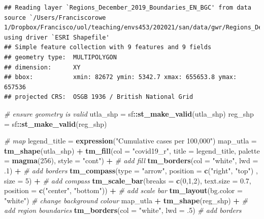 \documentclass[
]{book}
\newenvironment{Shaded}{\begin{snugshade}}{\end{snugshade}}
\newcommand{\CommentTok}[1]{\textcolor[rgb]{0.56,0.35,0.01}{\textit{#1}}}
\newcommand{\DataTypeTok}[1]{\textcolor[rgb]{0.13,0.29,0.53}{#1}}
\newcommand{\DecValTok}[1]{\textcolor[rgb]{0.00,0.00,0.81}{#1}}
\newcommand{\FloatTok}[1]{\textcolor[rgb]{0.00,0.00,0.81}{#1}}
\newcommand{\KeywordTok}[1]{\textcolor[rgb]{0.13,0.29,0.53}{\textbf{#1}}}
\newcommand{\NormalTok}[1]{#1}
\newcommand{\OperatorTok}[1]{\textcolor[rgb]{0.81,0.36,0.00}{\textbf{#1}}}
\newcommand{\StringTok}[1]{\textcolor[rgb]{0.31,0.60,0.02}{#1}}
\begin{document}
\begin{verbatim}
## Reading layer `Regions_December_2019_Boundaries_EN_BGC' from data source `/Users/Franciscorowe 1/Dropbox/Francisco/uol/teaching/envs453/202021/san/data/gwr/Regions_December_2019_Boundaries_EN_BGC.shp' using driver `ESRI Shapefile'
## Simple feature collection with 9 features and 9 fields
## geometry type:  MULTIPOLYGON
## dimension:      XY
## bbox:           xmin: 82672 ymin: 5342.7 xmax: 655653.8 ymax: 657536
## projected CRS:  OSGB 1936 / British National Grid
\end{verbatim}

\begin{Shaded}
\begin{Highlighting}[]
\CommentTok{# ensure geometry is valid}
\NormalTok{utla_shp =}\StringTok{ }\NormalTok{sf}\OperatorTok{::}\KeywordTok{st_make_valid}\NormalTok{(utla_shp)}
\NormalTok{reg_shp =}\StringTok{ }\NormalTok{sf}\OperatorTok{::}\KeywordTok{st_make_valid}\NormalTok{(reg_shp)}

\CommentTok{# map}
\NormalTok{legend_title =}\StringTok{ }\KeywordTok{expression}\NormalTok{(}\StringTok{"Cumulative cases per 100,000"}\NormalTok{)}
\NormalTok{map_utla =}\StringTok{ }\KeywordTok{tm_shape}\NormalTok{(utla_shp) }\OperatorTok{+}
\StringTok{  }\KeywordTok{tm_fill}\NormalTok{(}\DataTypeTok{col =} \StringTok{"covid19_r"}\NormalTok{, }\DataTypeTok{title =}\NormalTok{ legend_title, }\DataTypeTok{palette =} \KeywordTok{magma}\NormalTok{(}\DecValTok{256}\NormalTok{), }\DataTypeTok{style =} \StringTok{"cont"}\NormalTok{) }\OperatorTok{+}\StringTok{ }\CommentTok{# add fill}
\StringTok{  }\KeywordTok{tm_borders}\NormalTok{(}\DataTypeTok{col =} \StringTok{"white"}\NormalTok{, }\DataTypeTok{lwd =} \FloatTok{.1}\NormalTok{)  }\OperatorTok{+}\StringTok{ }\CommentTok{# add borders}
\StringTok{  }\KeywordTok{tm_compass}\NormalTok{(}\DataTypeTok{type =} \StringTok{"arrow"}\NormalTok{, }\DataTypeTok{position =} \KeywordTok{c}\NormalTok{(}\StringTok{"right"}\NormalTok{, }\StringTok{"top"}\NormalTok{) , }\DataTypeTok{size =} \DecValTok{5}\NormalTok{) }\OperatorTok{+}\StringTok{ }\CommentTok{# add compass}
\StringTok{  }\KeywordTok{tm_scale_bar}\NormalTok{(}\DataTypeTok{breaks =} \KeywordTok{c}\NormalTok{(}\DecValTok{0}\NormalTok{,}\DecValTok{1}\NormalTok{,}\DecValTok{2}\NormalTok{), }\DataTypeTok{text.size =} \FloatTok{0.7}\NormalTok{, }\DataTypeTok{position =}  \KeywordTok{c}\NormalTok{(}\StringTok{"center"}\NormalTok{, }\StringTok{"bottom"}\NormalTok{)) }\OperatorTok{+}\StringTok{ }\CommentTok{# add scale bar}
\StringTok{  }\KeywordTok{tm_layout}\NormalTok{(}\DataTypeTok{bg.color =} \StringTok{"white"}\NormalTok{) }\CommentTok{# change background colour}
\NormalTok{map_utla }\OperatorTok{+}\StringTok{ }\KeywordTok{tm_shape}\NormalTok{(reg_shp) }\OperatorTok{+}\StringTok{ }\CommentTok{# add region boundaries}
\StringTok{  }\KeywordTok{tm_borders}\NormalTok{(}\DataTypeTok{col =} \StringTok{"white"}\NormalTok{, }\DataTypeTok{lwd =} \FloatTok{.5}\NormalTok{) }\CommentTok{# add borders}
\end{Highlighting}
\end{Shaded}
\end{document}
